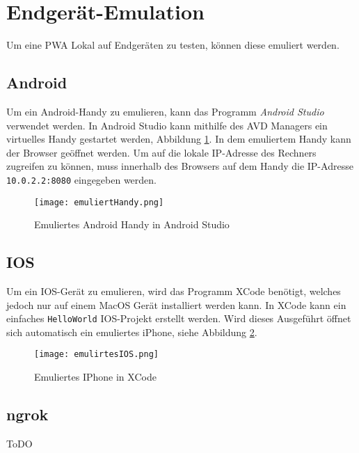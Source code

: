 \section{Endgerät-Emulation}

Um eine PWA Lokal auf Endgeräten zu testen, können diese emuliert werden.   

\subsection{Android}
Um ein Android-Handy zu emulieren, kann das Programm \textit{Android Studio} verwendet werden. In Android Studio kann mithilfe des \ac{AVD Managers} ein virtuelles Handy gestartet werden, Abbildung \ref{Android1}. In dem emuliertem Handy kann der Browser geöffnet werden. Um auf die lokale IP-Adresse des Rechners zugreifen zu können, muss innerhalb des Browsers auf dem Handy die IP-Adresse \texttt{10.0.2.2:8080} eingegeben werden. 

\begin{figure}[!htb]
    \centering
    \texttt{[image: emuliertHandy.png]}
    \caption {Emuliertes Android Handy in Android Studio}
    \label{Android1}
\end{figure}

\subsection{IOS}

Um ein IOS-Gerät zu emulieren, wird das Programm XCode benötigt, welches jedoch nur auf einem MacOS Gerät installiert werden kann. In XCode kann ein einfaches \texttt{HelloWorld} IOS-Projekt erstellt werden. Wird dieses Ausgeführt öffnet sich automatisch ein emuliertes iPhone, siehe Abbildung \ref{img:emuIOS}.

\begin{figure}
    \centering
    \texttt{[image: emulirtesIOS.png]}
    \caption{Emuliertes IPhone in XCode}
    \label{img:emuIOS}
\end{figure}

\subsection{ngrok}


ToDO 



